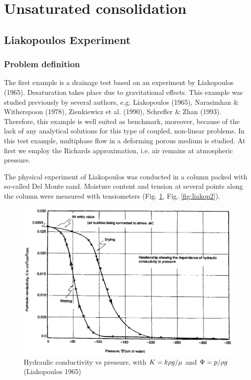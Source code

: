 \section{Unsaturated consolidation}



\subsection{Liakopoulos Experiment}
\label{sec:Liakopoulos} 

\subsubsection*{Problem definition}
The first example
is a drainage test
based on an experiment by Liakopoulos (1965).
Desaturation takes place due to gravitational effects.
This example was studied previously by several authors,
e.g.
Liakopoulos (1965),
Narasimhan \& Witherspoon (1978),
Zienkiewicz et al. (1990),
Schrefler \& Zhan (1993).
Therefore, this example is well suited as benchmark,
moreover, because of the lack of any analytical solutions
for this type of coupled, non-linear problems.
In this test example,
multiphase flow in a deforming porous medium is studied.
At first we employ the Richards approximation,
i.e. air remains at atmospheric pressure.

The physical experiment of Liakopoulos was conducted in a column
packed with so-called Del Monte sand. Moisture content and tension
at several points along the column were measured with tensiometers
(Fig. \ref{fig:liakop1}, Fig. \ref{fig:liakop2}).

\begin{figure}[htb!]
\begin{center}
\footnotesize
\includegraphics[width=0.6\columnwidth]{HM/HM_unsat/liakop1.eps}  %
\caption{Hydraulic conductivity vs pressure,
with $K = k\rho g/\mu$ and $\Psi = p/\rho g$
(Liakopoulos 1965)
}
\label{fig:liakop1}
\end{center}
\end{figure}
%

